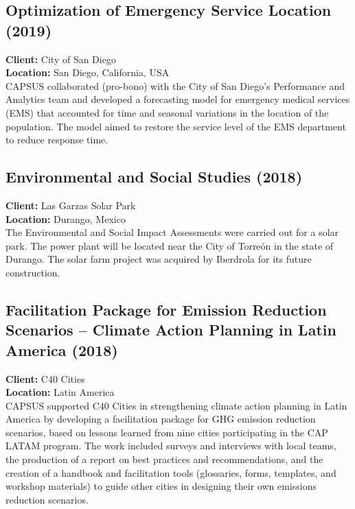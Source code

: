 \documentclass[
	a4paper,
	12pt,
	unnumberedsections,
]{CSSullivanBusinessReport}
\begin{document}
\subsection{Optimization of Emergency Service Location (2019)}
\textbf{Client:}  City of San Diego \\
\textbf{Location:}  San Diego, California, USA \\[0.5em]
 CAPSUS collaborated (pro-bono) with the City of San Diego's Performance and Analytics team and developed a forecasting model for emergency medical services (EMS) that accounted for time and seasonal variations in the location of the population. The model aimed to restore the service level of the EMS department to reduce response time.

\subsection{Environmental and Social Studies (2018)}
\textbf{Client:}  Las Garzas Solar Park \\
\textbf{Location:}  Durango, Mexico \\[0.5em]
 The Environmental and Social Impact Assessments were carried out for a solar park. The power plant will be located near the City of Torreón in the state of Durango. The solar farm project was acquired by Iberdrola for its future construction.

\subsection{Facilitation Package for Emission Reduction Scenarios – Climate Action Planning in Latin America (2018)}
\textbf{Client:}  C40 Cities \\
\textbf{Location:}  Latin America \\[0.5em]
 CAPSUS supported C40 Cities in strengthening climate action planning in Latin America by developing a facilitation package for GHG emission reduction scenarios, based on lessons learned from nine cities participating in the CAP LATAM program. The work included surveys and interviews with local teams, the production of a report on best practices and recommendations, and the creation of a handbook and facilitation tools (glossaries, forms, templates, and workshop materials) to guide other cities in designing their own emissions reduction scenarios.
\end{document}
